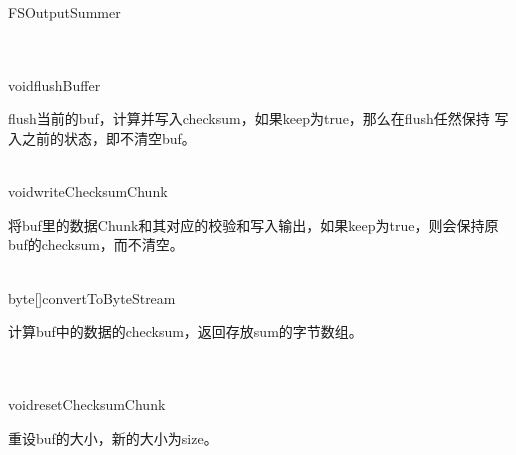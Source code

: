 \begin{XeClass}{FSOutputSummer}
  \begin{XeMethod}{\XeProtected\\ \XeSync\\ }{void}{flushBuffer}
       
 flush当前的buf，计算并写入checksum，如果keep为true，那么在flush任然保持
 写入之前的状态，即不清空buf。

  \end{XeMethod}

  \begin{XeMethod}{\XePrivate\\ }{void}{writeChecksumChunk}
       
 将buf里的数据Chunk和其对应的校验和写入输出，如果keep为true，则会保持原
 buf的checksum，而不清空。

  \end{XeMethod}

  \begin{XeMethod}{\XePublic\\ }{byte[]}{convertToByteStream}
       
 计算buf中的数据的checksum，返回存放sum的字节数组。

  \end{XeMethod}

  \begin{XeMethod}{\XeProtected\\ \XeSync\\ }{void}{resetChecksumChunk}
       
 重设buf的大小，新的大小为size。

  \end{XeMethod}

\end{XeClass}
